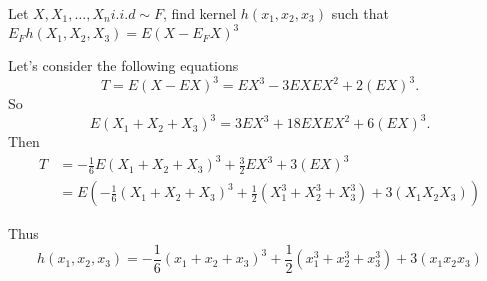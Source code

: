 \begin{problem}
    Let $X,X_1,\ldots,X_n i.i.d\sim F$, find kernel $h(x_1,x_2,x_3)$ such that $E_Fh(X_1,X_2,X_3)=E(X-E_FX)^3$
\end{problem}

\begin{solution}
    Let's consider the following equations
    \begin{equation*}
        T=E(X-E X)^{3}=E X^{3}-3 E X E X^{2}+2(E X)^{3}.
    \end{equation*}
    So
    \begin{equation*}
        E(X_1 + X_2 + X_3)^3 = 3EX^3 + 18EXEX^2 + 6(EX)^3.
    \end{equation*}
    Then
    \begin{equation*}
        \begin{split} 
            T &=-\frac{1}{6} E\left(X_{1}+X_{2}+X_{3}\right)^{3}+\frac{3}{2} E X^{3}+3(E X)^{3} \\ 
            &=E\left(-\frac{1}{6}\left(X_{1}+X_{2}+X_{3}\right)^{3}+\frac{1}{2}\left(X_{1}^{3}+X_{2}^{3}+X_{3}^{3}\right)+3\left(X_{1} X_{2} X_{3}\right)\right) 
        \end{split}
    \end{equation*}

    Thus
    \begin{equation*}
        h\left(x_{1}, x_{2}, x_{3}\right)=-\frac{1}{6}\left(x_{1}+x_{2}+x_{3}\right)^{3}+\frac{1}{2}\left(x_{1}^{3}+x_{2}^{3}+x_{3}^{3}\right)+3\left(x_{1} x_{2} x_{3}\right)
    \end{equation*}


\end{solution}



